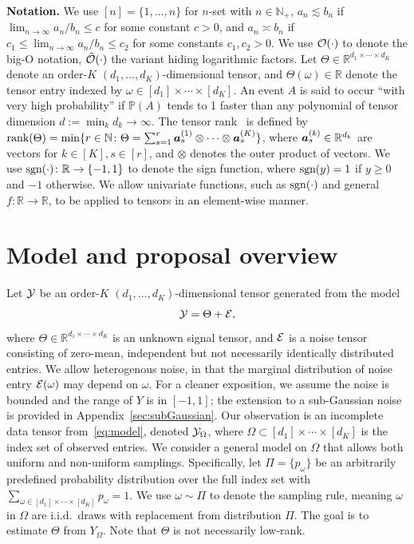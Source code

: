 \documentclass{article}
\theoremstyle{plain}
\theoremstyle{definition}
\def\sign{\textup{sgn}}
\begin{document}
{\bf Notation.} We use $[n]=\{1,\ldots,n\}$ for $n$-set with $n\in\mathbb{N}_{+}$, $a_n\lesssim b_n$ if $\lim_{n\to\infty} a_n/b_n\leq c$ for some constant $c>0$, and $a_n\asymp b_n$ if $c_1\leq \lim_{n\to \infty} a_n/b_n\leq c_2$ for some constants $c_1,c_2>0$. We use $\mathcal{O}(\cdot)$ to denote the big-O notation, $\tilde {\mathcal{O}}(\cdot)$ the variant hiding logarithmic factors. Let $\Theta\in\mathbb{R}^{d_1\times \cdots \times d_K}$ denote an order-$K$ $(d_1,\ldots,d_K)$-dimensional tensor, and $\Theta(\omega)\in\mathbb{R}$ denote the tensor entry indexed by $\omega \in[d_1]\times \cdots \times [d_K]$. An event $A$ is said to occur ``with very high probability'' if $\mathbb{P}(A)$ tends to 1 faster than any polynomial of tensor dimension $d:=\min_k d_k \to\infty$. The tensor rank~\citep{hitchcock1927expression} is defined by $\text{rank}(\Theta)=\min\{r\in\mathbb{N}\colon \Theta=\sum_{s=1}^r\bm{a}^{(1)}_s\otimes\cdots\otimes \bm{a}^{(K)}_s\}$, where $\bm{a}^{(k)}_s\in\mathbb{R}^{d_k}$ are vectors for $k\in[K], s\in[r]$, and $\otimes$ denotes the outer product of vectors. We use $\sign(\cdot)\colon \mathbb{R}\to\{-1,1\}$ to denote the sign function, where $\sign(y)=1$ if $y\geq 0$ and $-1$ otherwise. We allow univariate functions, such as $\sign(\cdot)$ and general $f\colon \mathbb{R}\to\mathbb{R}$, to be applied to tensors in an element-wise manner. 


\section{Model and proposal overview}\label{sec:overview}
Let $\mathcal{Y}$ be an order-$K$ $(d_1,\ldots,d_K)$-dimensional tensor generated from the model
\begin{equation}\label{eq:model}
\mathcal{Y}=\Theta+\mathcal{E},
\end{equation}
where $\Theta\in\mathbb{R}^{d_1\times \cdots \times d_K}$ is an unknown signal tensor, and $\mathcal{E}$ is a noise tensor consisting of zero-mean, independent but not necessarily identically distributed entries. We allow heterogenous noise, in that the marginal distribution of noise entry $\mathcal{E}(\omega)$ may depend on $\omega$. For a cleaner exposition, we assume the noise is bounded and the range of $Y$ is in $[-1,1]$; the extension to a sub-Gaussian noise is provided in Appendix~\ref{sec:subGaussian}. Our observation is an incomplete data tensor from~\eqref{eq:model}, denoted  $\mathcal{Y}_\Omega$, where $\Omega\subset[d_1]\times\cdots\times[d_K]$ is the index set of observed entries. We consider a general model on $\Omega$ that allows both uniform and non-uniform samplings. Specifically, let $\Pi=\{p_\omega\}$ be an arbitrarily predefined probability distribution over the full index set with $\sum_{\omega\in[d_1]\times \cdots \times [d_K]}p_\omega=1$. We use $\omega\sim \Pi$ to denote the sampling rule, meaning $\omega$ in $\Omega$ are i.i.d.\ draws with replacement from distribution $\Pi$. The goal is to estimate $\Theta$ from $Y_{\Omega}$. Note that $\Theta$ is not necessarily low-rank. 
\end{document}
